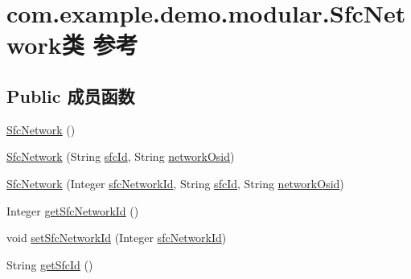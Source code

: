 \hypertarget{classcom_1_1example_1_1demo_1_1modular_1_1_sfc_network}{}\section{com.\+example.\+demo.\+modular.\+Sfc\+Network类 参考}
\label{classcom_1_1example_1_1demo_1_1modular_1_1_sfc_network}
\subsection*{Public 成员函数}
\begin{DoxyCompactItemize}
\item 
\mbox{\hyperlink{classcom_1_1example_1_1demo_1_1modular_1_1_sfc_network_a91d61ba2e383277cb685830875f75a7e}{Sfc\+Network}} ()
\item 
\mbox{\hyperlink{classcom_1_1example_1_1demo_1_1modular_1_1_sfc_network_a0be979fdd7d01b237188c3e0f089e136}{Sfc\+Network}} (String \mbox{\hyperlink{classcom_1_1example_1_1demo_1_1modular_1_1_sfc_network_ac12f9b32b0341d0773a1740d96319fd6}{sfc\+Id}}, String \mbox{\hyperlink{classcom_1_1example_1_1demo_1_1modular_1_1_sfc_network_a618bd5cc969b51e60c80013089b723a9}{network\+Osid}})
\item 
\mbox{\hyperlink{classcom_1_1example_1_1demo_1_1modular_1_1_sfc_network_a63921c568587bd216423b0045b06a735}{Sfc\+Network}} (Integer \mbox{\hyperlink{classcom_1_1example_1_1demo_1_1modular_1_1_sfc_network_ac72a53a8f025c5bd50d26846425948ce}{sfc\+Network\+Id}}, String \mbox{\hyperlink{classcom_1_1example_1_1demo_1_1modular_1_1_sfc_network_ac12f9b32b0341d0773a1740d96319fd6}{sfc\+Id}}, String \mbox{\hyperlink{classcom_1_1example_1_1demo_1_1modular_1_1_sfc_network_a618bd5cc969b51e60c80013089b723a9}{network\+Osid}})
\item 
Integer \mbox{\hyperlink{classcom_1_1example_1_1demo_1_1modular_1_1_sfc_network_ae025589c8863fd90f13fcec0a4242b5a}{get\+Sfc\+Network\+Id}} ()
\item 
void \mbox{\hyperlink{classcom_1_1example_1_1demo_1_1modular_1_1_sfc_network_a15f5c9e7c9ba90cd637f1cd106691380}{set\+Sfc\+Network\+Id}} (Integer \mbox{\hyperlink{classcom_1_1example_1_1demo_1_1modular_1_1_sfc_network_ac72a53a8f025c5bd50d26846425948ce}{sfc\+Network\+Id}})
\item 
String \mbox{\hyperlink{classcom_1_1example_1_1demo_1_1modular_1_1_sfc_network_aab2b2342abeddb5efbe5f0b5411c1e61}{get\+Sfc\+Id}} ()
\item 

\end{DoxyCompactItemize}
